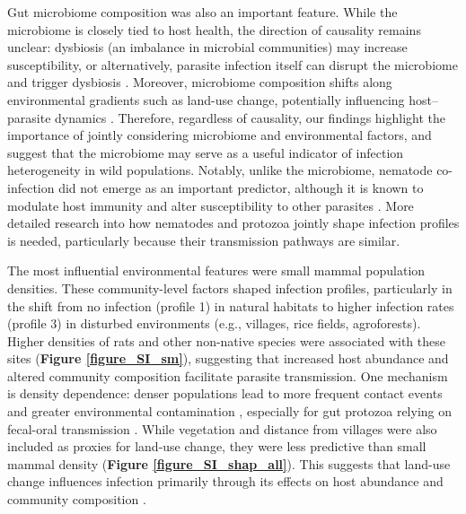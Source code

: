 \documentclass[oneside, a4paper, onecolumn, 11pt]{article}
\begin{document}
Gut microbiome composition was also an important feature. While the microbiome is closely tied to host health, the direction of causality remains unclear: dysbiosis (an imbalance in microbial communities) may increase susceptibility, or alternatively, parasite infection itself can disrupt the microbiome and trigger dysbiosis \citep{Levy2017-ec, Brussow2020-st}. Moreover, microbiome composition shifts along environmental gradients such as land-use change, potentially influencing host–parasite dynamics \citep{Markfeld2025-ny, Bernardo-Cravo2020-yr}. Therefore, regardless of causality, our findings highlight the importance of jointly considering microbiome and environmental factors, and suggest that the microbiome may serve as a useful indicator of infection heterogeneity in wild populations. Notably, unlike the microbiome, nematode co-infection did not emerge as an important predictor, although it is known to modulate host immunity and alter susceptibility to other parasites \citep{Keegan2024-ts,Ezenwa2016-dq}. More detailed research into how nematodes and protozoa jointly shape infection profiles is needed, particularly because their transmission pathways are similar.

The most influential environmental features were small mammal population densities. These community-level factors shaped infection profiles, particularly in the shift from no infection (profile 1) in natural habitats to higher infection rates (profile 3) in disturbed environments (e.g., villages, rice fields, agroforests). Higher densities of rats and other non-native species were associated with these sites (\textbf{Figure \ref{figure_SI_sm}}), suggesting that increased host abundance and altered community composition facilitate parasite transmission. One mechanism is density dependence: denser populations lead to more frequent contact events and greater environmental contamination \citep{Gajewski2024-wb}, especially for gut protozoa relying on fecal-oral transmission \citep{Sulaiman2025-ss}. While vegetation and distance from villages were also included as proxies for land-use change, they were less predictive than small mammal density (\textbf{Figure \ref{figure_SI_shap_all}}). This suggests that land-use change influences infection primarily through its effects on host abundance and community composition \citep{Budria2014-xu}.
\end{document}
